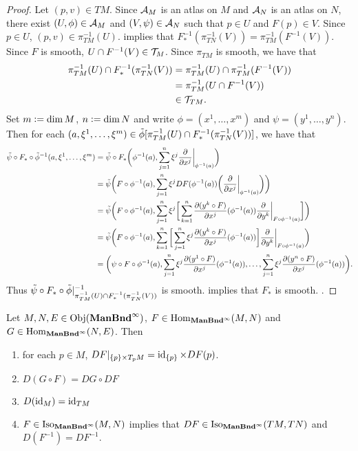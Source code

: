 \documentclass{book}
\begin{document}
\begin{proof}
	Let $(p,v) \in TM$. Since $\mathcal{A}_M$ is an atlas on $M$ and $\mathcal{A}_N$ is an atlas on $N$, there exist $(U, \phi) \in \mathcal{A}_M$ and $(V, \psi) \in \mathcal{A}_N$ such that $p \in U$ and $F(p) \in V$. Since $p \in U$, $(p,v) \in \pi_{TM}^{-1}(U)$.  implies that $F_*^{-1}(\pi_{TN}^{-1}(V)) = \pi_{TM}^{-1}(F^{-1}(V))$. Since $F$ is smooth, $U \cap F^{-1}(V) \in \mathcal{T}_M$. Since $\pi_{TM}$ is smooth, we have that 
	\begin{align*}
		\pi_{TM}^{-1}(U) \cap F_*^{-1}(\pi_{TN}^{-1}(V)) 
		& = \pi_{TM}^{-1}(U) \cap \pi_{TM}^{-1}(F^{-1}(V)) \\
		& = \pi_{TM}^{-1}(U \cap F^{-1}(V)) \\
		& \in \mathcal{T}_{TM}.
	\end{align*}
	Set $m \vcentcolon= \dim M$, $n \vcentcolon= \dim N$ and write $\phi = (x^1, \ldots, x^m)$ and $\psi = (y^1, \ldots, y^n)$.  Then for each $(a, \xi^1, \ldots, \xi^m) \in \tilde{\phi}[\pi_{TM}^{-1}(U) \cap F_*^{-1}(\pi_{TN}^{-1}(V))]$, we have that
	\begin{align*}
		\tilde{\psi} \circ F_* \circ \tilde{\phi}^{-1}(a, \xi^1, \ldots, \xi^m)
		& = \tilde{\psi} \circ F_*\bigg(\phi^{-1}(a), \sum_{j=1}^n \xi^j \frac{\partial}{\partial x^j} \bigg|_{\phi^{-1}(a)} \bigg) \\
		& =  \tilde{\psi} \bigg(F \circ \phi^{-1}(a), \sum_{j=1}^n \xi^j DF(\phi^{-1}(a)) \bigg( \frac{\partial}{\partial x^j} \bigg|_{\phi^{-1}(a)} \bigg) \bigg) \\
		& = \tilde{\psi} \bigg(F \circ \phi^{-1}(a), \sum_{j=1}^n \xi^j \bigg[ \sum_{k=1}^n \frac{\partial (y^k \circ F)}{\partial x^j}(\phi^{-1}(a)) \frac{\partial}{\partial y^k} \bigg|_{F \circ \phi^{-1}(a)} \bigg]  \bigg) \\
		& = \tilde{\psi} \bigg(F \circ \phi^{-1}(a),  \sum_{k=1}^n \bigg[  \sum_{j=1}^n \xi^j \frac{\partial (y^k \circ F)}{\partial x^j}(\phi^{-1}(a))  \bigg] \frac{\partial}{\partial y^k} \bigg|_{F \circ \phi^{-1}(a)}  \bigg) \\
		& = \bigg( \psi \circ F \circ \phi^{-1}(a),  \sum_{j=1}^n \xi^j \frac{\partial (y^1 \circ F)}{\partial x^j}(\phi^{-1}(a)), \ldots, \sum_{j=1}^n \xi^j \frac{\partial (y^n \circ F)}{\partial x^j}(\phi^{-1}(a))\bigg).
	\end{align*}
	Thus $\tilde{\psi} \circ F_* \circ \tilde{\phi}|_{\pi_{TM}^{-1}(U) \cap F_*^{-1}(\pi_{TN}^{-1}(V))}^{-1}$ is smooth.  implies that $F_*$ is smooth. .
\end{proof}

\begin{ex}
	Let $M,N, E \in \operatorname{Obj}(\operatorname*{\text{\textbf{ManBnd}}^{\infty}})$, $F \in \operatorname{Hom}_{\operatorname*{\text{\textbf{ManBnd}}^{\infty}}}(M, N)$ and $G \in \operatorname{Hom}_{\operatorname*{\text{\textbf{ManBnd}}^{\infty}}}(N, E)$. Then
	\begin{enumerate}
		\item for each $p \in M$, $DF|_{\{p\} \times T_pM} = \operatorname{id}_{\{p\}} \times DF(p)$.
		\item $D(G \circ F) = DG \circ DF$
		\item $D(\operatorname{id}_M) = \operatorname{id}_{TM}$
		\item $F \in \operatorname{Iso}_{\operatorname*{\text{\textbf{ManBnd}}^{\infty}}}(M, N)$ implies that $DF \in \operatorname{Iso}_{\operatorname*{\text{\textbf{ManBnd}}^{\infty}}}(TM, TN)$ and $D(F^{-1}) = DF^{-1}$. 
	\end{enumerate}
\end{ex}
\end{document}
